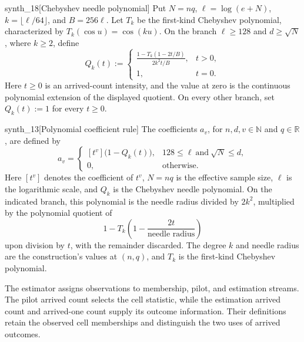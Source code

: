 \documentclass[11pt]{article}
\begin{document}
\begin{definitionv}{synth_18}[Chebyshev needle polynomial]
Put \(N=nq\), \(\ell=\log(e+N)\), \(k=\lfloor\ell/64\rfloor\), and \(B=256\ell\). Let \(T_k\) be the first-kind Chebyshev polynomial, characterized by \(T_k(\cos u)=\cos(ku)\). On the branch \(\ell\ge128\) and \(d\ge\sqrt N\), where \(k\ge2\), define
\[
Q_k(t):=
\begin{cases}
\displaystyle\frac{1-T_k(1-2t/B)}{2k^2t/B},&t>0,\\[6pt]
1,&t=0.
\end{cases}
\]
Here \(t\ge0\) is an arrived-count intensity, and the value at zero is the continuous polynomial extension of the displayed quotient. On every other branch, set \(Q_k(t):=1\) for every \(t\ge0\).
\end{definitionv}

\begin{definitionv}{synth_13}[Polynomial coefficient rule]
The coefficients \(a_v\), for \(n,d,v\in\mathbb N\) and \(q\in\mathbb R\), are defined by
\[
a_v=
\begin{cases}
[t^v]\bigl(1-Q_k(t)\bigr),
& 128\le \ell \ \text{and}\ \sqrt{N}\le d,\\
0,
& \text{otherwise}.
\end{cases}
\]
Here \([t^v]\) denotes the coefficient of \(t^v\), \(N=nq\) is the effective sample size, \(\ell\) is the logarithmic scale, and \(Q_k\) is the Chebyshev needle polynomial. On the indicated branch, this polynomial is the needle radius divided by \(2k^2\), multiplied by the polynomial quotient of
\[
1-T_k\!\left(1-\frac{2t}{\text{needle radius}}\right)
\]
upon division by \(t\), with the remainder discarded. The degree \(k\) and needle radius are the construction's values at \((n,q)\), and \(T_k\) is the first-kind Chebyshev polynomial.
\end{definitionv}

The estimator assigns observations to membership, pilot, and estimation streams. The pilot arrived count  selects the cell statistic, while the estimation arrived count  and arrived-one count  supply its outcome information. Their definitions retain the observed cell memberships and distinguish the two uses of arrived outcomes.
\end{document}
